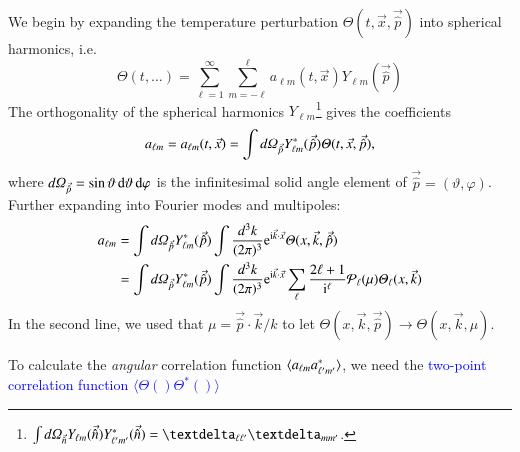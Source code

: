 We begin by expanding the temperature perturbation $\Theta(t, \vec{x}, \vec{\hat{p}})$ into spherical harmonics, i.e.
\begin{equation}
    \Theta(t, \dots) = \sum_{\ell=1}^{\infty} \sum_{m=-\ell}^{\ell} a_{\ell m}(t, \vec{x}) Y_{\ell m} (\vec{\hat{p}})
\end{equation}
The orthogonality of the spherical harmonics $Y_{\ell m}$\footnote{$\int \dOmg[n] Y\ellm(\vec{\hat{n}}) Y\ellmp^*(\vec{\hat{n}}) = \deltasym{\ell \ell'} \deltasym{m m'} $.} gives the coefficients
\begin{equation}
    a\ellm = a\ellm(t,\vec{x}) = \int \dOmg[p] Y^*_{\ell m} (\vec{\hat{p}}) \Theta(t, \vec{x}, \vec{\hat{p}}),
\end{equation}
where $d\varOmega_{\vec{\hat{p}}} = \sin{\vartheta} \diff \vartheta\diff \varphi$ is the infinitesimal solid angle element of $\vec{\hat{p}} = (\vartheta, \varphi)$. Further expanding into Fourier modes and multipoles:
\begin{equation}
\begin{split}
    a_{\ell m} &= \int \dOmg[p] Y^*_{\ell m} (\vec{\hat{p}}) \int \frac{d^3 k}{(2\pi)^3} \eu[\im \vec{k}\cdot \vec{x}] \Theta(x, \vec{k}, \vec{\hat{p}})  \\
    &= \int \dOmg[p] Y^*_{\ell m} (\vec{\hat{p}}) \int \frac{d^3 k}{(2\pi)^3} \eu[\im \vec{k}\cdot \vec{x}]\sum_{\ell} \frac{2\ell + 1}{\im^\ell} \mathcal{P}_\ell(\mu) \Theta_\ell(x, \vec{k})
\end{split}
\end{equation}
In the second line, we used that $\mu=\vec{\hat{p}}\cdot\vec{k}/k$ to let $\Theta(x,\vec{k}, \vec{\hat{p}}) \to\Theta(x,\vec{k},\mu) $.


To calculate the \textit{angular} correlation function $\langle a\ellm a^*\ellmp \rangle$, we need the \textcolor{blue}{two-point correlation function $\langle \Theta() \Theta^*()\rangle$} 



